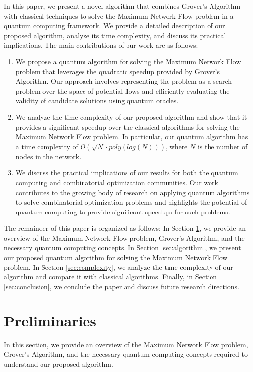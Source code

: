 In this paper, we present a novel algorithm that combines Grover's Algorithm with classical techniques to solve the Maximum Network Flow problem in a quantum computing framework. We provide a detailed description of our proposed algorithm, analyze its time complexity, and discuss its practical implications. The main contributions of our work are as follows:

\begin{enumerate}
    \item We propose a quantum algorithm for solving the Maximum Network Flow problem that leverages the quadratic speedup provided by Grover's Algorithm. Our approach involves representing the problem as a search problem over the space of potential flows and efficiently evaluating the validity of candidate solutions using quantum oracles.
    
    \item We analyze the time complexity of our proposed algorithm and show that it provides a significant speedup over the classical algorithms for solving the Maximum Network Flow problem. In particular, our quantum algorithm has a time complexity of $O(\sqrt{N} \cdot poly(log(N)))$, where $N$ is the number of nodes in the network.
    
    \item We discuss the practical implications of our results for both the quantum computing and combinatorial optimization communities. Our work contributes to the growing body of research on applying quantum algorithms to solve combinatorial optimization problems and highlights the potential of quantum computing to provide significant speedups for such problems.
\end{enumerate}

The remainder of this paper is organized as follows: In Section \ref{sec:preliminaries}, we provide an overview of the Maximum Network Flow problem, Grover's Algorithm, and the necessary quantum computing concepts. In Section \ref{sec:algorithm}, we present our proposed quantum algorithm for solving the Maximum Network Flow problem. In Section \ref{sec:complexity}, we analyze the time complexity of our algorithm and compare it with classical algorithms. Finally, in Section \ref{sec:conclusion}, we conclude the paper and discuss future research directions.

\section{Preliminaries}\label{sec:preliminaries}
In this section, we provide an overview of the Maximum Network Flow problem, Grover's Algorithm, and the necessary quantum computing concepts required to understand our proposed algorithm.

